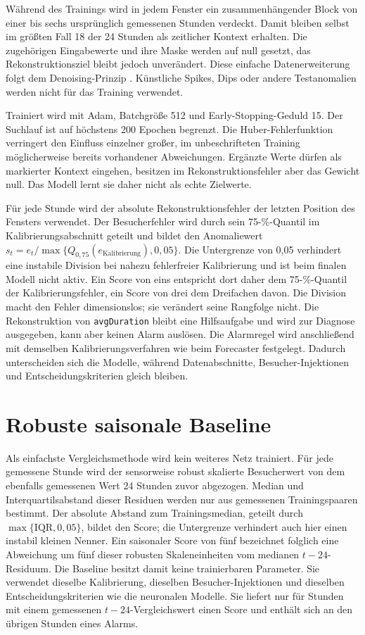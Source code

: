 Während des Trainings wird in jedem Fenster ein zusammenhängender Block von
einer bis sechs ursprünglich gemessenen Stunden verdeckt. Damit bleiben selbst im
größten Fall 18 der 24 Stunden als zeitlicher Kontext erhalten. Die zugehörigen
Eingabewerte und ihre Maske werden auf null gesetzt, das Rekonstruktionsziel
bleibt jedoch unverändert. Diese einfache Datenerweiterung folgt dem
Denoising-Prinzip \cite{vincent2008denoising}. Künstliche Spikes, Dips oder
andere Testanomalien werden nicht für das Training verwendet.

Trainiert wird mit Adam, Batchgröße 512 und Early-Stopping-Geduld 15. Der
Suchlauf ist auf höchstens 200 Epochen begrenzt. Die
Huber-Fehlerfunktion verringert den Einfluss einzelner großer,
im unbeschrifteten Training möglicherweise bereits vorhandener Abweichungen.
Ergänzte Werte dürfen als markierter Kontext eingehen, besitzen im
Rekonstruktionsfehler aber das Gewicht null. Das Modell lernt sie daher nicht
als echte Zielwerte.

Für jede Stunde wird der absolute Rekonstruktionsfehler der letzten Position
des Fensters verwendet. Der Besucherfehler wird durch sein 75-\%-Quantil im
Kalibrierungsabschnitt geteilt und bildet den Anomaliewert
$s_t=e_t/\max\{Q_{0{,}75}(e_{\mathrm{Kalibrierung}}),0{,}05\}$. Die Untergrenze
von 0{,}05 verhindert eine instabile Division bei nahezu fehlerfreier
Kalibrierung und ist beim finalen Modell nicht aktiv. Ein Score von eins
entspricht dort daher dem 75-\%-Quantil der Kalibrierungsfehler, ein Score von
drei dem Dreifachen davon. Die Division macht den Fehler dimensionslos; sie
verändert seine Rangfolge nicht. Die Rekonstruktion
von \texttt{avgDuration} bleibt eine Hilfsaufgabe und wird zur Diagnose
ausgegeben, kann aber keinen Alarm auslösen. Die Alarmregel wird anschließend
mit demselben Kalibrierungsverfahren wie beim Forecaster festgelegt. Dadurch
unterscheiden sich die Modelle, während Datenabschnitte, Besucher-Injektionen
und Entscheidungskriterien gleich bleiben.

\section[Baseline]{Robuste saisonale Baseline}

Als einfachste Vergleichsmethode wird kein weiteres Netz trainiert. Für jede
gemessene Stunde wird der sensorweise robust skalierte Besucherwert von dem
ebenfalls gemessenen Wert 24 Stunden zuvor abgezogen. Median und
Interquartilsabstand dieser Residuen werden nur aus gemessenen
Trainingspaaren bestimmt. Der absolute Abstand zum Trainingsmedian, geteilt
durch $\max\{\mathrm{IQR},0{,}05\}$, bildet den Score; die Untergrenze verhindert
auch hier einen instabil kleinen Nenner. Ein saisonaler Score von fünf
bezeichnet folglich eine Abweichung um fünf dieser robusten Skaleneinheiten vom
medianen $t-24$-Residuum.
Die Baseline besitzt damit keine trainierbaren Parameter. Sie verwendet
dieselbe Kalibrierung, dieselben Besucher-Injektionen und dieselben
Entscheidungskriterien wie die neuronalen Modelle. Sie liefert nur für Stunden
mit einem gemessenen $t-24$-Vergleichswert einen Score und enthält sich an den
übrigen Stunden eines Alarms.

